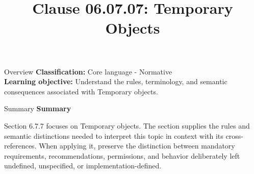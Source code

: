 \documentclass[10pt,letterpaper]{article}
\title{Clause 06.07.07: Temporary Objects}
\author{}
\date{}
\begin{document}
\maketitle
\begin{CornellOverviewBox}{Overview}
\textbf{Classification:} Core language - Normative\\[2pt]
\textbf{Learning objective:} Understand the rules, terminology, and semantic consequences associated with Temporary objects.
\end{CornellOverviewBox}\begin{CornellSummaryBox}{Summary}
{\sffamily\bfseries\color{Accent} Summary}\par\vspace{3pt}Section 6.7.7 focuses on Temporary objects. The section supplies the rules and semantic distinctions needed to interpret this topic in context with its cross-references. When applying it, preserve the distinction between mandatory requirements, recommendations, permissions, and behavior deliberately left undefined, unspecified, or implementation-defined.
\end{CornellSummaryBox}
\end{document}
